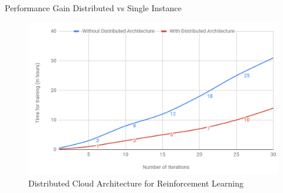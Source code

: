 \documentclass[final]{beamer}
\newlength{\onecolwid}
\newlength{\twocolwid}
\begin{document}
\begin{frame}[t]
\begin{columns}[t]
\begin{column}{\twocolwid}
\begin{columns}[t,totalwidth=\twocolwid]
\begin{column}{\onecolwid}
\begin{block}{Performance Gain Distributed vs Single Instance}
\begin{figure}
\includegraphics[width=1.0\linewidth]{performance_gain.png}
\caption{Distributed Cloud Architecture for Reinforcement Learning}
\end{figure}


\end{block}


\end{column} %

\end{columns} %





\begin{columns}[t,totalwidth=\twocolwid] %

\begin{column}{\onecolwid} %



\end{column}
\end{columns}
\end{column}
\end{columns}
\end{frame}
\end{document}

